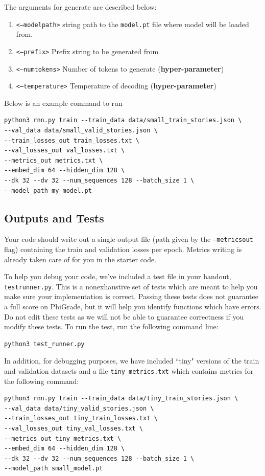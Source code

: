 \documentclass[11pt,addpoints,answers]{exam}
\begin{document}
The arguments for generate are described below:
\begin{enumerate}
    \item \texttt{<--model\textunderscore path>} string path to the \texttt{model.pt} file where model will be loaded from.
    \item \texttt{<--prefix>} Prefix string to be generated from
    \item \texttt{<--num\textunderscore tokens>} Number of tokens to generate (\textbf{hyper-parameter})
    \item \texttt{<--temperature>} Temperature of decoding (\textbf{hyper-parameter})
\end{enumerate}
Below is an example command to run

\begin{lstlisting}
python3 rnn.py train --train_data data/small_train_stories.json \
--val_data data/small_valid_stories.json \
--train_losses_out train_losses.txt \ 
--val_losses_out val_losses.txt \
--metrics_out metrics.txt \
--embed_dim 64 --hidden_dim 128 \
--dk 32 --dv 32 --num_sequences 128 --batch_size 1 \
--model_path my_model.pt
\end{lstlisting}
\vspace{0.2 in}

\subsection{Outputs and Tests} 
Your code should write out a single output file (path given by the \texttt{--metrics\textunderscore out} flag) containing the train and validation losses per epoch. Metrics writing is already taken care of for you in the starter code.

To help you debug your code, we’ve included a test file in your handout, \texttt{test\textunderscore runner.py}. This is a nonexhaustive set of tests which are meant to help you make sure your implementation is correct. Passing these tests does not guarantee a full score on PhiGrade, but it will help you identify functions which have errors. Do not edit these tests as we will not be able to guarantee correctness if you modify these tests. To run the test, run the following command line:
\begin{lstlisting}[language=Shell]
python3 test_runner.py
\end{lstlisting}

In addition, for debugging purposes, we have included ``tiny" versions of the train and validation datasets and a file \texttt{tiny\_metrics.txt} which contains metrics for the following command:
\begin{lstlisting}
python3 rnn.py train --train_data data/tiny_train_stories.json \
--val_data data/tiny_valid_stories.json \
--train_losses_out tiny_train_losses.txt \ 
--val_losses_out tiny_val_losses.txt \
--metrics_out tiny_metrics.txt \
--embed_dim 64 --hidden_dim 128 \
--dk 32 --dv 32 --num_sequences 128 --batch_size 1 \
--model_path small_model.pt
\end{lstlisting}
\end{document}
